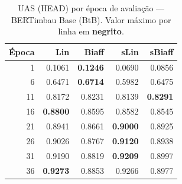 \clearpage
\begin{table}[p]
\centering
\caption{UAS (HEAD) por \'epoca de avalia\c{c}\~ao --- BERTimbau Base (BtB).
Valor m\'aximo por linha em \textbf{negrito}.}
\label{tab:instab-btb-head}
\begingroup
\small\setlength{\tabcolsep}{10pt}\renewcommand{\arraystretch}{1.2}%
\begin{tabular}{r r r r r}
\toprule
\textbf{\'Epoca} & \textbf{Lin} & \textbf{Biaff} & \textbf{sLin} & \textbf{sBiaff} \\
\midrule
   1 & 0.1061 & \textbf{0.1246} & 0.0690 & 0.0856 \\
   6 & 0.6471 & \textbf{0.6714} & 0.5982 & 0.6475 \\
  11 & 0.8172 & 0.8231 & 0.8139 & \textbf{0.8291} \\
  16 & \textbf{0.8800} & 0.8595 & 0.8582 & 0.8545 \\
  21 & 0.8941 & 0.8661 & \textbf{0.9000} & 0.8925 \\
  26 & 0.9026 & 0.8767 & \textbf{0.9120} & 0.8938 \\
  31 & 0.9190 & 0.8819 & \textbf{0.9209} & 0.8997 \\
  36 & \textbf{0.9273} & 0.8853 & 0.9266 & 0.8977 \\
\bottomrule
\end{tabular}
\endgroup
\instablegendaFull
\end{table}

